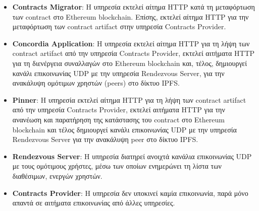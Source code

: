 \begin{itemize}
    \item \textbf{Contracts Migrator}: Η υπηρεσία εκτελεί αίτημα HTTP κατά τη μεταφόρτωση των \textenglish{contract} στο Ethereum blockchain. Eπίσης, εκτελεί αίτημα HTTP για την μεταφόρτωση των \textenglish{contract artifact} στην υπηρεσία Contracts Provider.

    \item \textbf{Concordia Application}: Η υπηρεσία εκτελεί αίτημα HTTP για τη λήψη των \textenglish{contract artifact} από την υπηρεσία Contracts Provider, εκτελεί αιτήματα HTTP για τη διενέργεια συναλλαγών στο Ethereum blockchain και, τέλος, δημιουργεί κανάλι επικοινωνίας UDP με την υπηρεσία Rendezvous Server, για την ανακάλυψη ομότιμων χρηστών (peers) στο δίκτυο IPFS.

    \item \textbf{Pinner}: Η υπηρεσία εκτελεί αίτημα HTTP για τη λήψη των \textenglish{contract artifact} από την υπηρεσία Contracts Provider, εκτελεί αιτήματα HTTP για την ανανέωση και παρατήρηση της κατάστασης του contract στο Ethereum blockchain και τέλος δημιουργεί κανάλι επικοινωνίας UDP με την υπηρεσία Rendezvous Server για την ανακάλυψη peer στο δίκτυο IPFS.

    \item \textbf{Rendezvous Server}: Η υπηρεσία διατηρεί ανοιχτά κανάλια επικοινωνίας UDP με τους ομότιμους χρήστες, μέσω των οποίων ενημερώνει τη λίστα των διαθέσιμων, ενεργών χρηστών.

    \item \textbf{Contracts Provider}: Η υπηρεσία δεν υποκινεί καμία επικοινωνία, παρά μόνο απαντά σε αιτήματα επικοινωνίας από άλλες υπηρεσίες.
\end{itemize}